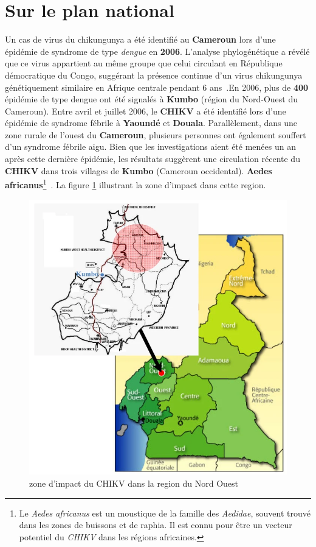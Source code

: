 \section{Sur le plan national}
Un cas de virus du chikungunya a été identifié au \textbf{Cameroun} lors d'une épidémie de syndrome de type \textit{dengue} en \textbf{2006}. L'analyse phylogénétique a révélé que ce virus appartient au même groupe que celui circulant en République démocratique du Congo, suggérant la présence continue d'un virus chikungunya génétiquement similaire en Afrique centrale pendant 6 ans~\cite{Peyrefitte2007}.En 2006, plus de \textbf{400} épidémie de type dengue ont été signalés à \textbf{Kumbo} (région du Nord-Ouest du Cameroun). Entre avril et juillet 2006, le \textbf{CHIKV} a été identifié lors d'une épidémie de syndrome fébrile à \textbf{Yaoundé} et \textbf{Douala}. Parallèlement, dans une zone rurale de l'ouest du \textbf{Cameroun}, plusieurs personnes ont également souffert d'un syndrome fébrile aigu. Bien que les investigations aient été menées un an après cette dernière épidémie, les résultats suggèrent une circulation récente du \textbf{CHIKV} dans trois villages de \textbf{Kumbo} (Cameroun occidental). \textbf{Aedes africanus}\footnote{Le \textit{Aedes africanus} est un moustique de la famille des \textit{Aedidae}, souvent trouvé dans les zones de buissons et de raphia. Il est connu pour être un vecteur potentiel du \textit{CHIKV} dans les régions africaines.}~\cite{demanou2010research}. La figure \ref{fig:chikvcameroon} illustrant la zone d'impact dans cette region.
\begin{figure}[h!]
	\centering
	\includegraphics[width=0.7\linewidth]{images/chikvcameroon}
	\caption{zone d'impact du CHIKV dans la region du Nord Ouest~\cite{demanou2010research}}
	\label{fig:chikvcameroon}
\end{figure}


